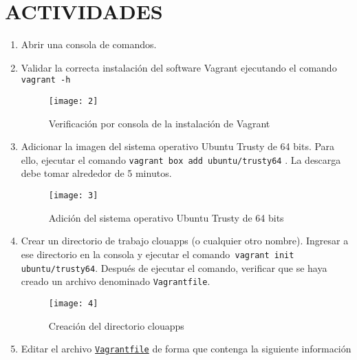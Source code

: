 \documentclass[10pt]{article}   			%
\begin{document}
\section{ACTIVIDADES}	

\begin{enumerate}


	\item  Abrir una consola de comandos.
	\item Validar la correcta instalación del software Vagrant ejecutando el comando \texttt{vagrant -h}
	
	\begin{figure}[H] %
		\centering
		\texttt{[image: 2]}   %
		\caption{Verificación por consola de la instalación de Vagrant} 
	\end{figure}
	
	\item Adicionar la imagen del sistema operativo Ubuntu Trusty de 64 bits. Para ello, ejecutar el 	comando \texttt{vagrant box add ubuntu/trusty64} . La descarga debe tomar alrededor de 5 minutos.
	
	\begin{figure}[H] %
		\centering
		\texttt{[image: 3]}   %
		\caption{Adición del sistema operativo Ubuntu Trusty de 64 bits } 
	\end{figure}
	
	\item Crear un directorio de trabajo clouapps (o cualquier otro nombre). Ingresar a ese directorio en la consola y ejecutar el comando\texttt{ vagrant init ubuntu/trusty64}. Después de ejecutar el comando, verificar que se haya creado un archivo denominado \texttt{Vagrantfile}.
	
		\begin{figure}[ht] 
			\centering
			\texttt{[image: 4]}   
			\caption{Creación del directorio clouapps} 
		\end{figure}
	
	\item Editar el archivo \texttt{\href{https://github.com/wilrilo/talleres/blob/master/file/taller3/Vagrantfile}{Vagrantfile}} de forma que contenga la siguiente información
	

\end{enumerate}
\end{document}
